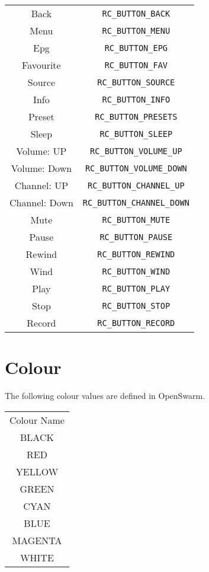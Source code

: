 \documentclass[a4paper,9pt]{extarticle}
\begin{document}
\begin{center}
\begin{longtable}{cc}
    Back & \texttt{RC\_BUTTON\_BACK}\\
    Menu & \texttt{RC\_BUTTON\_MENU}\\
    Epg & \texttt{RC\_BUTTON\_EPG}\\
    Favourite & \texttt{RC\_BUTTON\_FAV}\\
    Source & \texttt{RC\_BUTTON\_SOURCE}\\
    Info & \texttt{RC\_BUTTON\_INFO}\\
    Preset & \texttt{RC\_BUTTON\_PRESETS}\\
    Sleep & \texttt{RC\_BUTTON\_SLEEP}\\
    Volume: UP & \texttt{RC\_BUTTON\_VOLUME\_UP}\\
    Volume: Down & \texttt{RC\_BUTTON\_VOLUME\_DOWN}\\
    Channel: UP & \texttt{RC\_BUTTON\_CHANNEL\_UP}\\
    Channel: Down & \texttt{RC\_BUTTON\_CHANNEL\_DOWN}\\
    Mute & \texttt{RC\_BUTTON\_MUTE}\\
    Pause & \texttt{RC\_BUTTON\_PAUSE}\\
    Rewind & \texttt{RC\_BUTTON\_REWIND}\\
    Wind & \texttt{RC\_BUTTON\_WIND}\\
    Play & \texttt{RC\_BUTTON\_PLAY}\\
    Stop & \texttt{RC\_BUTTON\_STOP}\\
    Record & \texttt{RC\_BUTTON\_RECORD}
\end{longtable}
\end{center}

\section{Colour}
The following colour values are defined in OpenSwarm.\\

\begin{center}
\begin{tabular}{c}
    \rowcolor{blue!50}
    Colour Name\\
    BLACK\\
    RED\\
    YELLOW\\
    GREEN\\
    CYAN\\
    BLUE\\
    MAGENTA\\
    WHITE\\
\end{tabular}\\
\end{center}
\end{document}
